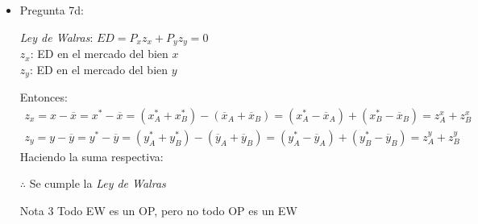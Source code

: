 \begin{itemize}
				\begin{nota}{Nota 2}
					Si se conoce $X_{A}^*$ y $Y_{A}^*$ solo reemplazas en:
						\begin{gather*}
							X_{B}^* = 30 - X_{A}^* \\
							Y_{B}^* = 30 - Y_{A}^*
						\end{gather*}
					para hallas fácilmente $X_{B}^*$ y $Y_{B}^*$
				\end{nota}
	\item Pregunta 7d:
				\begin{center}
					\emph{Ley de Walras}: $ED = P_x z_x+P_y z_y=0$ \\[0.4cm]
					$z_x$: ED en el mercado del bien $x$\\[0.4cm]
					$z_y$: ED en el mercado del bien $y$
				\end{center}
			Entonces:
				\begin{gather*}
					z_x = x - \overline{x} = x^* - \overline{x}  = \left(x_{A}^* + x_{B}^* \right) - \left(\overline{x}_A + \overline{x}_B \right) = \left( x_{A}^* - \overline{x}_A\right) + \left( x_{B}^* - \overline{x}_B\right) = z_{A}^{x} + z_{B}^{x} \\[0.4cm]
					z_y = y - \overline{y} = y^* - \overline{y}  = \left(y_{A}^* + y_{B}^* \right) - \left(\overline{y}_A + \overline{y}_B \right) = \left( y_{A}^* - \overline{y}_A\right) + \left( y_{B}^* - \overline{y}_B\right) = z_{A}^{y} + z_{B}^{y}
				\end{gather*}
			Haciendo la suma respectiva:
				\begin{center}
				\end{center}
				\vspace{-0.5cm}
			$\therefore$ Se cumple la \emph{Ley de Walras}
				\begin{nota}{Nota 3}
					Todo EW es un OP, pero no todo OP es un EW
				\end{nota}
			

\end{itemize}
